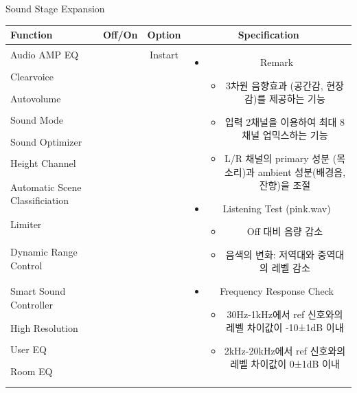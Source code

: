 \documentclass{beamer}
\begin{document}
	\begin{frame}[t]{Sound Stage Expansion}
		\begin{tiny}
			\begin{tabular}{@{}lccc@{}}
				\toprule
				Function & Off/On & Option & Specification \\
				\midrule
				Audio AMP EQ & \color{black}{Off} & Instart &
				\multirow{14}{60mm}{
					\begin{itemize}
						\item Remark
						\begin{itemize}
							\item 3차원 음향효과 (공간감, 현장감)를 제공하는 기능
							\item 입력 2채널을 이용하여 최대 8채널 업믹스하는 기능
							\item L/R 채널의 primary 성분 (목소리)과 ambient 성분(배경음, 잔향)을 조절
						\end{itemize}
						\item Listening Test (pink.wav)
						\begin{itemize}
							\item Off 대비 음량 감소
							\item 음색의 변화: 저역대와 중역대의 레벨 감소
						\end{itemize}
						\item Frequency Response Check
						\begin{itemize}
							\item 30Hz-1kHz에서 ref 신호와의 레벨 차이값이 -10±1dB 이내
							\item 2kHz-20kHz에서 ref 신호와의 레벨 차이값이 0±1dB 이내
						\end{itemize}
					\end{itemize}
				} \\
				Clearvoice & \color{black}{Off} & & \\
				Autovolume & \color{black}{Off} & & \\
				Sound Mode & \color{black}{Off} & & \\
				Sound Optimizer & \color{black}{Off} & & \\
				Height Channel & \color{black}{Off} & & \\
				Automatic Scene Classificiation & \color{black}{Off} & & \\
				Limiter & \color{black}{Off} & & \\
				\color{blue}{Sound Stage Expansion} & \color{blue}{On} & & \\
				Dynamic Range Control & \color{black}{Off} & & \\
				Smart Sound Controller & \color{black}{Off} & & \\
				High Resolution & \color{black}{Off} & & \\
				User EQ & \color{black}{Off} & & \\
				Room EQ & \color{black}{Off} & & \\
				\color{blue}{OSD Volume} & \color{blue}{On} &  \color{blue}{Vol.40} & \\
				\midrule
			\end{tabular}
		\end{tiny}
		

\end{frame}
\end{document}
